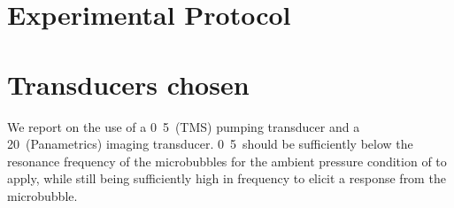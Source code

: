 
\section{Experimental Protocol}\label{sec:DPR500_protocol}




\section{Transducers chosen}
We report on the use of a  \unit{0.5}\mega\hertz\ (TMS) pumping transducer and a 20\mega\hertz\ (Panametrics) imaging transducer.
 \unit{0.5}\mega\hertz\ should be sufficiently below the resonance frequency of the microbubbles for the ambient pressure condition of  
to apply, while still being sufficiently high in frequency to elicit a response from the microbubble.







